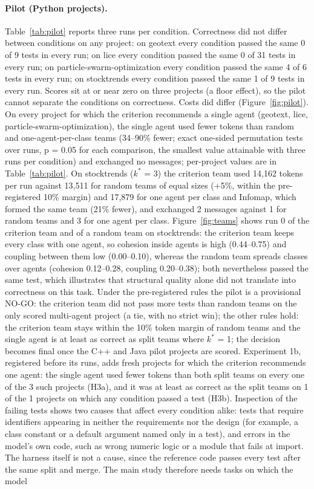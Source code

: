 \paragraph{Pilot (Python projects).} Table~\ref{tab:pilot} reports three runs per condition. Correctness did not differ between conditions on any project: on geotext every condition passed the same 0 of 9 tests in every run; on lice every condition passed the same 0 of 31 tests in every run; on particle-swarm-optimization every condition passed the same 4 of 6 tests in every run; on stocktrends every condition passed the same 1 of 9 tests in every run. Scores sit at or near zero on three projects (a floor effect), so the pilot cannot separate the conditions on correctness. Costs did differ (Figure~\ref{fig:pilot}). On every project for which the criterion recommends a single agent (geotext, lice, particle-swarm-optimization), the single agent used fewer tokens than random and one-agent-per-class teams (34--90\% fewer; exact one-sided permutation tests over runs, p = 0.05 for each comparison, the smallest value attainable with three runs per condition) and exchanged no messages; per-project values are in Table~\ref{tab:pilot}. On stocktrends ($k^\ast$ = 3) the criterion team used 14,162 tokens per run against 13,511 for random teams of equal sizes (+5\%, within the pre-registered 10\% margin) and 17,879 for one agent per class and Infomap, which formed the same team (21\% fewer), and exchanged 2 messages against 1 for random teams and 3 for one agent per class. Figure~\ref{fig:teams} shows run 0 of the criterion team and of a random team on stocktrends: the criterion team keeps every class with one agent, so cohesion inside agents is high (0.44--0.75) and coupling between them low (0.00--0.10), whereas the random team spreads classes over agents (cohesion 0.12--0.28, coupling 0.20--0.38); both nevertheless passed the same test, which illustrates that structural quality alone did not translate into correctness on this task. Under the pre-registered rules the pilot is a provisional NO-GO: the criterion team did not pass more tests than random teams on the only scored multi-agent project (a tie, with no strict win); the other rules hold: the criterion team stays within the 10\% token margin of random teams and the single agent is at least as correct as split teams where $k^\ast$ = 1; the decision becomes final once the C++ and Java pilot projects are scored. Experiment 1b, registered before its runs, adds fresh projects for which the criterion recommends one agent: the single agent used fewer tokens than both split teams on every one of the 3 such projects (H3a), and it was at least as correct as the split teams on 1 of the 1 projects on which any condition passed a test (H3b). Inspection of the failing tests shows two causes that affect every condition alike: tests that require identifiers appearing in neither the requirements nor the design (for example, a class constant or a default argument named only in a test), and errors in the model's own code, such as wrong numeric logic or a module that fails at import. The harness itself is not a cause, since the reference code passes every test after the same split and merge. The main study therefore needs tasks on which the model 